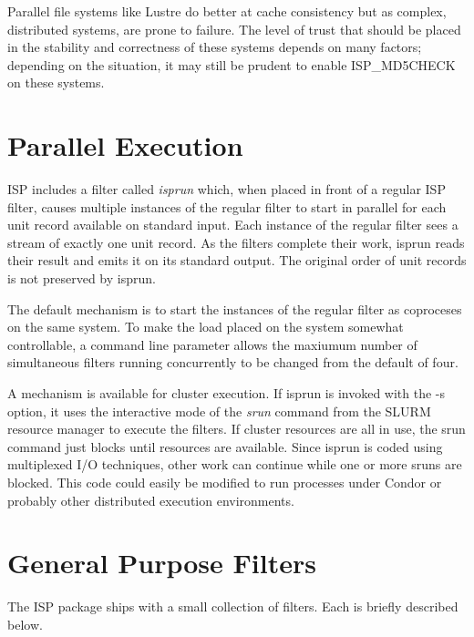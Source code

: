\documentclass{article}
\begin{document}
Parallel file systems like Lustre\cite{Lustre} do better at cache consistency
but as complex, distributed systems, are prone to failure.  The level of 
trust that should be placed in the stability and correctness of these systems 
depends on many factors; depending on the situation, it may still be prudent to
enable ISP\_MD5CHECK on these systems.


\section{Parallel Execution}\label{secparallel}

ISP includes a filter called {\em isprun} which, when placed in front of
a regular ISP filter, causes multiple instances of the regular filter to
start in parallel for each unit record available on standard input.
Each instance of the regular filter sees a stream of exactly one unit record.
As the filters complete their work, isprun reads their result and emits it
on its standard output.  The original order of unit records is not 
preserved by isprun.

The default mechanism is to start the instances of the regular filter as
coproceses on the same system.  To make the load placed on the system
somewhat controllable, a command line parameter allows the maxiumum number 
of simultaneous filters running concurrently to be changed from the default 
of four.

A mechanism is available for cluster execution.  If isprun is invoked with
the -s option, it uses the interactive mode of the {\em srun} command 
from the SLURM resource manager\cite{Slurm} to execute the filters.  
If cluster resources are all in use, the srun command just blocks until 
resources are available.  Since isprun is coded using multiplexed I/O 
techniques, other work can continue while one or more sruns are blocked.
This code could easily be modified to run processes under Condor\cite{Condor} 
or probably other distributed execution environments.

\section{General Purpose Filters}\label{secfilters}

The ISP package ships with a small collection of filters.
Each is briefly described below.
\end{document}
